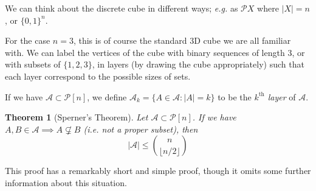 \documentclass[]{article}
\theoremstyle{custhm}
\theoremstyle{cusdef}
\theoremstyle{custhm}
\theoremstyle{custhm}
\theoremstyle{custhm}
\theoremstyle{custhm}
\newtheorem*{theorem*}{Theorem}
\theoremstyle{cusdef}
\theoremstyle{remark}
\renewcommand{\it}[1]{\textit{#1}}
\newcommand{\A}{\mathcal{A}}
\begin{document}
We can think about the discrete cube in different ways; \it{e.g.} as $\mathcal{P}X$ where $|X| = n$, or $\{0,1\}^n$.

For the case $n = 3$, this is of course the standard 3D cube we are all familiar with. We can label the vertices of the cube with binary sequences of length 3, or with subsets of $\{1,2,3\}$, in layers (by drawing the cube appropriately) such that each layer correspond to the possible sizes of sets.

If we have $\A \subset \mathcal{P}[n]$, we define $\A_k = \{A\in\A:|A| = k\}$ to be the \it{$k^{\textrm{th}}$ layer} of $\A$.

\begin{theorem*}[Sperner's Theorem]
Let $\A \subset \mathcal{P}[n]$. If we have $A,B\in\A\implies A\not\subsetneq B$ (\textrm{i.e.} not a proper subset), then
\[
|\A| \le \binom{n}{\lfloor n/2 \rfloor}
\]
\end{theorem*}
This proof has a remarkably short and simple proof, though it omits some further information about this situation.
\end{document}
